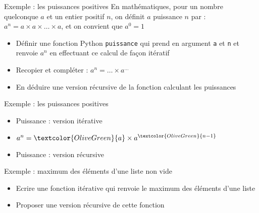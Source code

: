 \documentclass[10pt]{beamer}
\begin{document}
\begin{frame}{\Ctitle}{\stitle}
	\begin{exampleblock}{Exemple : les puissances positives}
		En mathématiques, pour un nombre quelconque $a$ et un entier positif $n$, on définit $a$ puissance $n$ par :\\
		$ a^n = a \times a \times \dots \times a $, et on convient que $a^0=1$
		\begin{itemize}
			\item<2->{Définir une fonction Python {\tt puissance} qui prend en argument {\tt a} et {\tt n} et renvoie $a^n$ en effectuant ce calcul de façon itératif}
			\item<3->{Recopier et compléter : $a^n = \dots \times a^{\dots}$}
			\item<4->{En déduire une version récursive de la fonction calculant les puissances}
		\end{itemize}
	\end{exampleblock}
\end{frame}

\begin{frame}{\Ctitle}{\stitle}
	\begin{exampleblock}{Exemple : les puissances positives}
		\begin{itemize}
			\item<1-> \textcolor{OliveGreen}{Puissance : version itérative}
			\item<2-> $a^n = \textcolor{OliveGreen}{a} \times a^{\textcolor{OliveGreen}{n-1}}$
			\item<3-> \textcolor{OliveGreen}{Puissance : version récursive}
		\end{itemize}
	\end{exampleblock}
\end{frame}

\begin{frame}{\Ctitle}{\stitle}
    \begin{exampleblock}{Exemple : maximum des éléments d'une liste non vide}
        \begin{itemize}
        \item<1-> {\small Ecrire une fonction itérative qui renvoie le maximum des éléments d'une liste}
        \item<3-> {\small Proposer une version récursive de cette fonction}
        \end{itemize}
    \end{exampleblock}
\end{frame}
\end{document}
